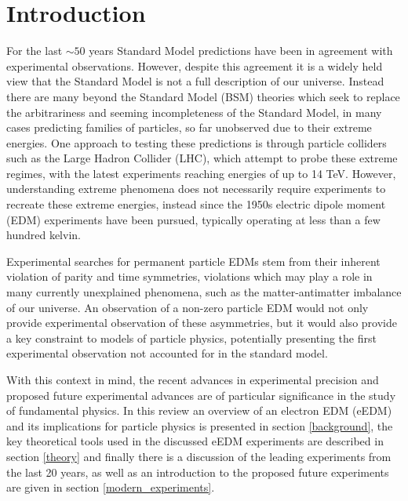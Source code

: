 \chapter{Introduction}
\label{introduction}

For the last ${\sim}50$ years Standard Model predictions have been in agreement with experimental observations. However, despite this agreement it is a widely held view that the Standard Model is not a full description of our universe. Instead there are many beyond the Standard Model (BSM) theories which seek to replace the  arbitrariness and seeming incompleteness of the Standard Model, in many cases predicting families of particles, so far unobserved due to their extreme energies. One approach to testing these predictions is through particle colliders such as the Large Hadron Collider (LHC), which attempt to probe these extreme regimes, with the latest experiments reaching energies of up to 14 TeV. However, understanding extreme phenomena does not necessarily require experiments to recreate these extreme energies, instead since the 1950s electric dipole moment (EDM) experiments have been pursued, typically operating at less than a few hundred kelvin.

Experimental searches for permanent particle EDMs stem from their inherent violation of parity and time symmetries, violations which may play a role in many currently unexplained phenomena, such as the matter-antimatter imbalance of our universe. An observation of a non-zero particle EDM would not only provide experimental observation of these asymmetries, but it would also provide a key constraint to models of particle physics, potentially presenting the first experimental observation not accounted for in the standard model.

With this context in mind, the recent advances in experimental precision and proposed future experimental advances are of particular significance in the study of fundamental physics. In this review an overview of an electron EDM (eEDM) and its implications for particle physics is presented in section \ref{background}, the key theoretical tools used in the discussed eEDM experiments are described in section \ref{theory} and finally there is a discussion of the leading experiments from the last 20 years, as well as an introduction to the proposed future experiments are given in section \ref{modern_experiments}.